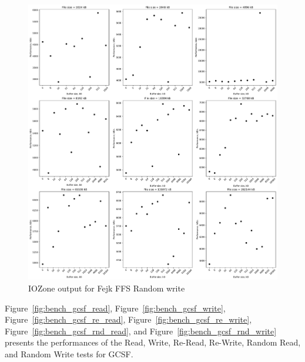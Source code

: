 \begin{figure}[!htb]
	\label{fig:bench_fffs_rnd_write}
	\begin{center}
		\includegraphics[width=1.0\textwidth]{figures/benchmarking/fejk-ffs/Random write.pdf}
	\end{center}
	\caption{IOZone output for Fejk FFS Random write}
\end{figure}

\FloatBarrier

Figure~\ref{fig:bench_gcsf_read}, Figure~\ref{fig:bench_gcsf_write}, Figure~\ref{fig:bench_gcsf_re_read}, Figure~\ref{fig:bench_gcsf_re_write}, Figure~\ref{fig:bench_gcsf_rnd_read}, and Figure~\ref{fig:bench_gcsf_rnd_write} presents the performances of the Read, Write, \mbox{Re-Read}, \mbox{Re-Write}, Random Read, and Random Write tests for \gls{GCSF}.


